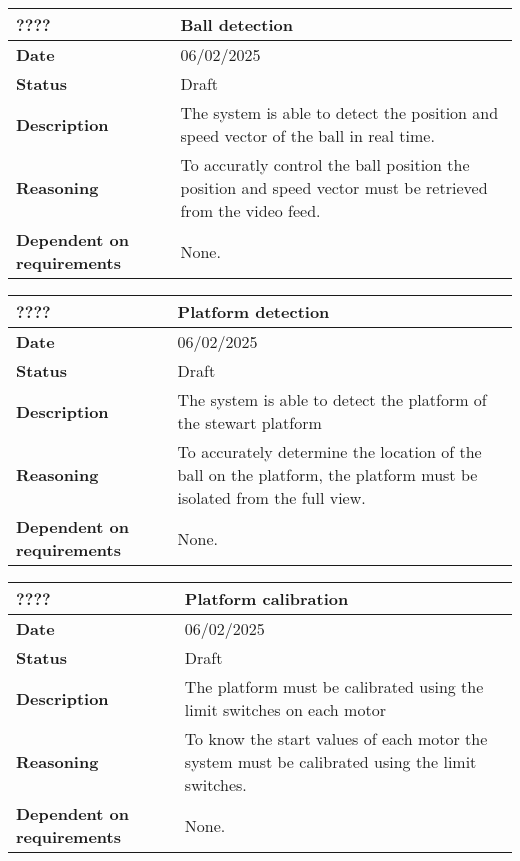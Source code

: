 \documentclass{article}
\begin{document}
\begin{table}[H]
    \renewcommand{\arraystretch}{1.3}
    \begin{tabular}{|l|p{10cm}|}
        \hline
        \rowcolor{gray!50}
        \textbf{????} & \textbf{Ball detection} \\ \hline
        \textbf{Date} & 06/02/2025 \\ \hline
        \textbf{Status} & Draft \\ \hline
        \textbf{Description} & The system is able to detect the position and speed vector of the ball in real time. \\ \hline
        \textbf{Reasoning} & To accuratly control the ball position the position and speed vector must be retrieved from the video feed. \\ \hline
        \textbf{Dependent on requirements} & None. \\ \hline
    \end{tabular}
\end{table}
\begin{table}[H]
    \renewcommand{\arraystretch}{1.3}
    \begin{tabular}{|l|p{10cm}|}
        \hline
        \rowcolor{gray!50}
        \textbf{????} & \textbf{Platform detection} \\ \hline
        \textbf{Date} & 06/02/2025 \\ \hline
        \textbf{Status} & Draft \\ \hline
        \textbf{Description} & The system is able to detect the platform of the stewart platform\\ \hline
        \textbf{Reasoning} & To accurately determine the location of the ball on the platform, the platform must be isolated from the full view. \\ \hline
        \textbf{Dependent on requirements} & None. \\ \hline
    \end{tabular}
\end{table}
\begin{table}[H]
    \renewcommand{\arraystretch}{1.3}
    \begin{tabular}{|l|p{10cm}|}
        \hline
        \rowcolor{gray!50}
        \textbf{????} & \textbf{Platform calibration} \\ \hline
        \textbf{Date} & 06/02/2025 \\ \hline
        \textbf{Status} & Draft \\ \hline
        \textbf{Description} & The platform must be calibrated using the limit switches on each motor\\ \hline
        \textbf{Reasoning} & To know the start values of each motor the system must be calibrated using the limit switches. \\ \hline
        \textbf{Dependent on requirements} & None. \\ \hline
    \end{tabular}
\end{table}
\end{document}
